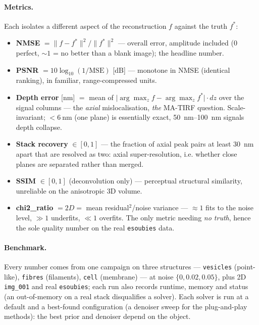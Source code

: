 \paragraph{Metrics.}
Each isolates a different aspect of the reconstruction $f$ against the truth $f^*$:
\begin{itemize}\setlength\itemsep{1pt}
\item \textbf{NMSE} $=\lVert f-f^*\rVert^2/\lVert f^*\rVert^2$ --- overall error, amplitude
  included ($0$ perfect, ${\sim}1$ = no better than a blank image); the headline number.
\item \textbf{PSNR} $=10\log_{10}(1/\mathrm{MSE})$ [dB] --- monotone in NMSE (identical ranking),
  in familiar, range-compressed units.
\item \textbf{Depth error} [nm] $=$ mean of $\lvert\arg\max_z f - \arg\max_z f^*\rvert\cdot dz$
  over the signal columns --- the \emph{axial} mislocalisation, \emph{the} MA-TIRF question.
  Scale-invariant; ${<}\SI{6}{\nano\meter}$ (one plane) is essentially exact,
  \SIrange{50}{100}{\nano\meter} signals depth collapse.
\item \textbf{Stack recovery} $\in[0,1]$ --- the fraction of axial peak pairs at least
  \SI{30}{\nano\meter} apart that are resolved as two: axial super-resolution, i.e. whether close
  planes are separated rather than merged.
\item \textbf{SSIM} $\in[0,1]$ (deconvolution only) --- perceptual structural similarity,
  unreliable on the anisotropic 3D volume.
\item \textbf{chi2\_ratio} $=2D=$ mean residual$^2$/noise variance --- ${\approx}1$ fits to the
  noise level, ${\gg}1$ underfits, ${\ll}1$ overfits. The only metric needing \emph{no truth},
  hence the sole quality number on the real \texttt{esoubies} data.
\end{itemize}

\paragraph{Benchmark.}
Every number comes from one campaign on three structures --- \texttt{vesicles} (point-like),
\texttt{fibres} (filaments), \texttt{cell} (membrane) --- at noise $\{0,0.02,0.05\}$, plus 2D
\texttt{img\_001} and real \texttt{esoubies}; each run also records runtime, memory and status (an
out-of-memory on a real stack disqualifies a solver). Each solver is run at a default and a
best-found configuration (a denoiser sweep for the plug-and-play methods): the best prior and
denoiser depend on the object.
